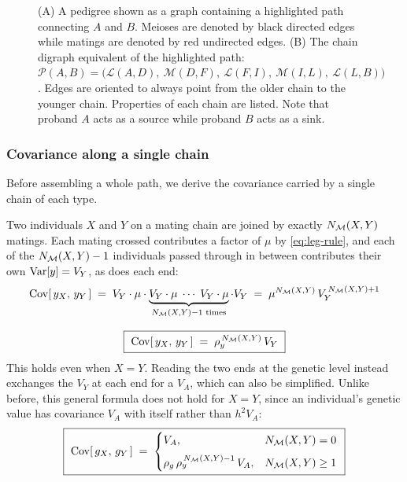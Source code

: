 \documentclass[12pt]{article}
\renewcommand{\Mu}{\mathcal{M}}
\renewcommand{\Lin}{\mathcal{L}}
\begin{document}
\begin{figure}[H]
    \begin{floatcard}
        

        \vspace{1.0em}
        
        \caption{%
            (A) A pedigree shown as a graph containing a highlighted path connecting $A$ and $B$.
            Meioses are denoted by black directed edges while matings are denoted by red undirected edges.
            (B) The chain digraph equivalent of the highlighted path:
            $\mathcal{P}(A,B) = \big(\Lin(A,D),\ \Mu(D,F),\ \Lin(F,I),\ \Mu(I,L),\ \Lin(L,B)\big)$.
            Edges are oriented to always point from the older chain to the younger chain.
            Properties of each chain are listed.
            Note that proband $A$ acts as a source while proband $B$ acts as a sink.
        }
        \label{fig:path-example}
    \end{floatcard}
\end{figure}

\subsubsection{Covariance along a single chain}
Before assembling a whole path, we derive the covariance carried by a single chain of each type.

Two individuals $X$ and $Y$ on a mating chain are joined by exactly $N_{\mathcal{M}}(X,Y)$ matings.
Each mating crossed contributes a factor of $\mu$ by \eqref{eq:leg-rule}, and each of the $N_{\mathcal{M}}(X,Y) - 1$ individuals passed through in between contributes their own $\mathrm{Var}[y] = V_Y$, as does each end:
\begin{equation}\label{eq:chain-y}
\begin{gathered}
    \mathrm{Cov}[\,y_X,\, y_Y\,] \;=\; V_Y \cdot \mu \cdot
    \underbrace{V_Y \cdot \mu \;\cdots\; V_Y \cdot \mu}_{N_{\mathcal{M}}(X,Y) - 1 \text{ times}} \cdot V_Y
    \;=\; \mu^{N_{\mathcal{M}}(X,Y)}\, V_Y^{\,N_{\mathcal{M}}(X,Y) + 1} \\[8pt]
    \boxed{\ \mathrm{Cov}[\,y_X,\, y_Y\,] \;=\; \rho_y^{\,N_{\mathcal{M}}(X,Y)}\, V_Y \ }
\end{gathered}
\end{equation}
This holds even when $X = Y$.
Reading the two ends at the genetic level instead exchanges the $V_Y$ at each end for a $V_A$, which can also be simplified.
Unlike before, this general formula does not hold for $X = Y$, since an individual's genetic value has covariance $V_A$ with itself rather than $h^2 V_A$:
\begin{equation}\label{eq:chain-g}
    \boxed{\
    \mathrm{Cov}[\,g_X,\, g_Y\,] \;=\;
    \begin{cases}
        V_A, & N_{\mathcal{M}}(X,Y) = 0 \\[6pt]
        \rho_g\, \rho_y^{\,N_{\mathcal{M}}(X,Y) - 1}\, V_A, & N_{\mathcal{M}}(X,Y) \geq 1
    \end{cases} \ }
\end{equation}
\end{document}
